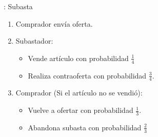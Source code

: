 %
%
%

\begin{frame}{\insertsection: Subasta}
	\begin{enumerate}
		\item Comprador envía oferta.
		\item Subastador:
			\begin{itemize}
				\item Vende artículo con probabilidad $\frac{1}{4}$
				\item Realiza contraoferta con probabilidad $\frac{3}{4}$.
			\end{itemize}
		\item Comprador (Si el artículo no se vendió):
			\begin{itemize}
				\item Vuelve a ofertar con probabilidad $\frac{1}{3}$.
				\item Abandona subasta con probabilidad $\frac{2}{3}$
			\end{itemize}
	\end{enumerate}
\end{frame}


